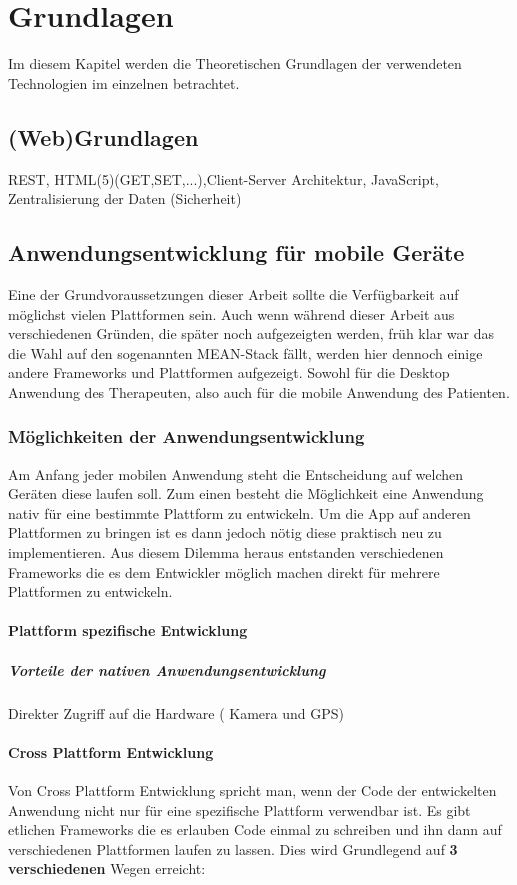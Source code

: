 \chapter{Grundlagen} \label{Theoretische Grundlagen}
Im diesem Kapitel werden die Theoretischen Grundlagen der verwendeten Technologien im einzelnen betrachtet.
\section{(Web)Grundlagen}
REST, HTML(5)(GET,SET,...),Client-Server Architektur, JavaScript, Zentralisierung der Daten (Sicherheit)
\section{Anwendungsentwicklung für mobile Geräte}
Eine der Grundvoraussetzungen dieser Arbeit sollte die Verfügbarkeit auf möglichst vielen Plattformen sein. Auch wenn während dieser Arbeit aus verschiedenen Gründen, die später noch aufgezeigten werden, früh klar war das die Wahl auf den sogenannten MEAN-Stack fällt, werden hier dennoch einige andere Frameworks und Plattformen aufgezeigt. Sowohl für die Desktop Anwendung des Therapeuten, also auch für die mobile Anwendung des Patienten.
\subsection{Möglichkeiten der Anwendungsentwicklung}
Am Anfang jeder mobilen Anwendung steht die Entscheidung auf welchen Geräten diese laufen soll. Zum einen besteht die Möglichkeit eine Anwendung nativ für eine bestimmte Plattform zu entwickeln. Um die App auf anderen Plattformen zu bringen ist es dann jedoch nötig diese praktisch neu zu implementieren. Aus diesem Dilemma heraus entstanden verschiedenen Frameworks die es dem Entwickler möglich machen direkt für mehrere Plattformen zu entwickeln.
\subsubsection{Plattform spezifische Entwicklung}
\paragraph*{Vorteile der nativen Anwendungsentwicklung} %
Direkter Zugriff auf die Hardware ( Kamera und GPS) 

\subsubsection{Cross Plattform Entwicklung}
Von Cross Plattform Entwicklung spricht man, wenn der Code der entwickelten Anwendung nicht nur für eine spezifische Plattform verwendbar ist. 
Es gibt etlichen Frameworks die es erlauben Code einmal zu schreiben und ihn dann auf verschiedenen Plattformen laufen zu lassen. Dies wird Grundlegend auf \textbf{3 verschiedenen} Wegen erreicht:
